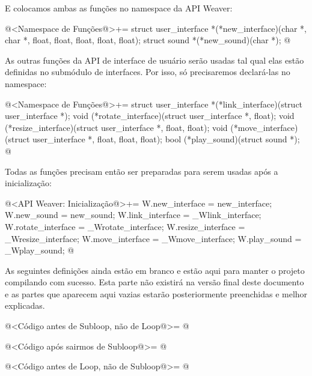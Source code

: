 E colocamos ambas as funções no namespace da API Weaver:

\iniciocodigo
@<Namespace de Funções@>+=
struct user_interface *(*new_interface)(char *, char *, float, float,
                                        float, float, float);
struct sound *(*new_sound)(char *);
@
\fimcodigo

As outras funções da API de interface de usuário serão usadas tal qual
elas estão definidas no submódulo de interfaces. Por isso, só
precisaremos declará-las no namespace:

\iniciocodigo
@<Namespace de Funções@>+=
struct user_interface *(*link_interface)(struct user_interface *);
void (*rotate_interface)(struct user_interface *, float);
void (*resize_interface)(struct user_interface *, float, float);
void (*move_interface)(struct user_interface *, float, float, float);
bool (*play_sound)(struct sound *);
@
\fimcodigo

Todas as funções precisam então ser preparadas para serem usadas após
a inicialização:

\iniciocodigo
@<API Weaver: Inicialização@>+=
W.new_interface = new_interface;
W.new_sound = new_sound;
W.link_interface = _Wlink_interface;
W.rotate_interface = _Wrotate_interface;
W.resize_interface = _Wresize_interface;
W.move_interface = _Wmove_interface;
W.play_sound = _Wplay_sound;
@
\fimcodigo


As seguintes definições ainda estão em branco e estão aqui para manter
o projeto compilando com sucesso. Esta parte não existirá na versão
final deste documento e as partes que aparecem aqui vazias estarão
posteriormente preenchidas e melhor explicadas.

\iniciocodigo
@<Código antes de Subloop, não de Loop@>=
@
\fimcodigo

\iniciocodigo
@<Código após sairmos de Subloop@>=
@
\fimcodigo

\iniciocodigo
@<Código antes de Loop, não de Subloop@>=
@
\fimcodigo




\fim
